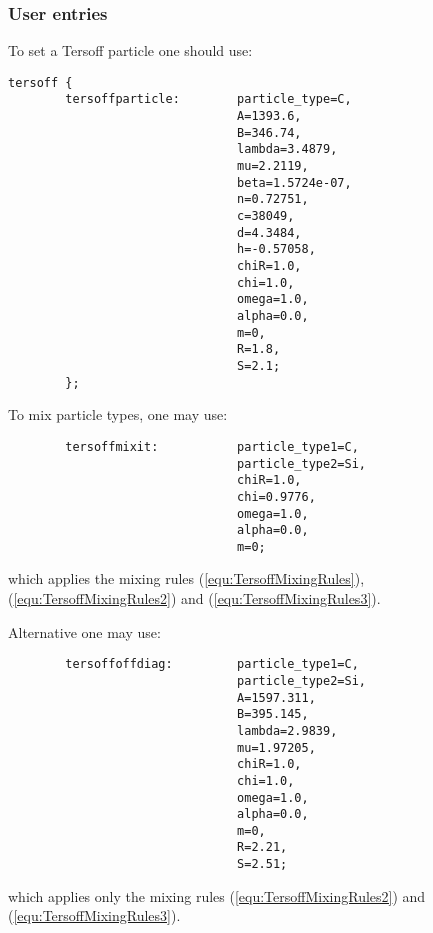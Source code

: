 \subsubsection{User entries}
To set a Tersoff particle one should use:
\begin{lstlisting}
tersoff {
        tersoffparticle:        particle_type=C,        
                                A=1393.6,
                                B=346.74,
                                lambda=3.4879,
                                mu=2.2119,
                                beta=1.5724e-07,
                                n=0.72751,
                                c=38049,
                                d=4.3484,
                                h=-0.57058,
                                chiR=1.0,      
                                chi=1.0,       
                                omega=1.0,
                                alpha=0.0, 
                                m=0, 
                                R=1.8, 
                                S=2.1;
        };
\end{lstlisting}

To mix particle types, one may use:
\begin{lstlisting}
        tersoffmixit:           particle_type1=C,       
                                particle_type2=Si,      
                                chiR=1.0,      
                                chi=0.9776,       
                                omega=1.0,
                                alpha=0.0, 
                                m=0;
\end{lstlisting}
which applies the mixing rules (\ref{equ:TersoffMixingRules}), (\ref{equ:TersoffMixingRules2}) and (\ref{equ:TersoffMixingRules3}).

Alternative one may use:
\begin{lstlisting}
        tersoffoffdiag:         particle_type1=C,       
                                particle_type2=Si,
                                A=1597.311,             
                                B=395.145,      
                                lambda=2.9839,  
                                mu=1.97205, 
                                chiR=1.0,      
                                chi=1.0,       
                                omega=1.0,
                                alpha=0.0, 
                                m=0, 
                                R=2.21,                 
                                S=2.51;
\end{lstlisting}
which applies only the mixing rules (\ref{equ:TersoffMixingRules2}) and (\ref{equ:TersoffMixingRules3}).

